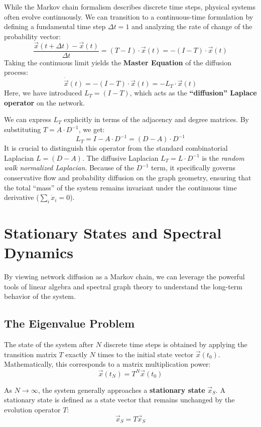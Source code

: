 While the Markov chain formalism describes discrete time steps, physical systems often evolve continuously. We can transition to a continuous-time formulation by defining a fundamental time step $\Delta t = 1$  and analyzing the rate of change of the probability vector:
\[
    \frac{\vec{x}(t + \Delta t) - \vec{x}(t)}{\Delta t} = (T - I) \cdot \vec{x}(t) = -(I - T) \cdot \vec{x}(t)
\]
Taking the continuous limit yields the \textbf{Master Equation} of the diffusion process:
\[
    \dot{\vec{x}}(t) = -(I - T) \cdot \vec{x}(t) = -L_T \cdot \vec{x}(t)
\]
Here, we have introduced $L_T = (I - T)$, which acts as the \textbf{``diffusion'' Laplace operator} on the network.

We can express $L_T$ explicitly in terms of the adjacency and degree matrices. By substituting $T = A \cdot D^{-1}$, we get:
\[
    L_T = I - A \cdot D^{-1} = (D - A) \cdot D^{-1}
\]
It is crucial to distinguish this operator from the standard combinatorial Laplacian $L = (D - A)$. The diffusive Laplacian $L_T = L \cdot D^{-1}$ is the \textit{random walk normalized Laplacian}. Because of the $D^{-1}$ term, it specifically governs conservative flow and probability diffusion on the graph geometry, ensuring that the total ``mass'' of the system remains invariant under the continuous time derivative ($\sum_i \dot{x}_i = 0$).

\section{Stationary States and Spectral Dynamics}

By viewing network diffusion as a Markov chain, we can leverage the powerful tools of linear algebra and spectral graph theory to understand the long-term behavior of the system.

\subsection{The Eigenvalue Problem}

The state of the system after $N$ discrete time steps is obtained by applying the transition matrix $T$ exactly $N$ times to the initial state vector $\vec{x}(t_0)$. Mathematically, this corresponds to a matrix multiplication power:
\[
    \vec{x}(t_N) = T^N \vec{x}(t_0)
\]


As $N \to \infty$, the system generally approaches a \textbf{stationary state} $\vec{x}_S$. A stationary state is defined as a state vector that remains unchanged by the evolution operator $T$:
\[
    \vec{x}_S = T \vec{x}_S
\]


